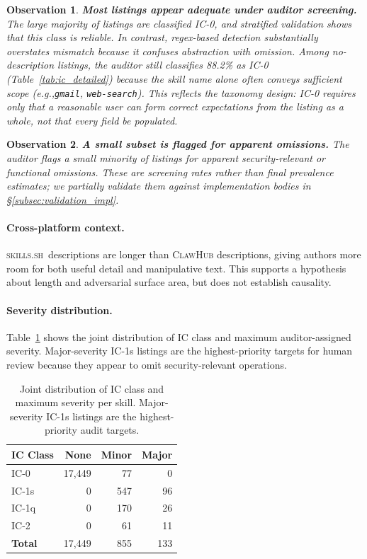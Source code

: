 \documentclass[11pt]{article}
\newtheorem{observation}{Observation}
\newcommand{\clawhub}{\textsc{ClawHub}\xspace}
\newcommand{\skillssh}{\textsc{skills.sh}\xspace}
\newcommand{\eg}{\textit{e.g.,}\xspace}
\begin{document}
\begin{observation}
\textbf{Most listings appear adequate under auditor screening.}
The large majority of listings are classified IC-0, and
stratified validation shows that this class is reliable.
In contrast, regex-based detection substantially overstates
mismatch because it confuses abstraction with omission.
Among no-description listings, the auditor still classifies
88.2\% as IC-0 (Table~\ref{tab:ic_detailed}) because
the skill \emph{name} alone often conveys sufficient scope
(\eg \texttt{gmail}, \texttt{web-search}).
This reflects the taxonomy design: IC-0 requires only that
a reasonable user can form correct expectations from the
listing as a whole, not that every field be populated.
\end{observation}

\begin{observation}
\textbf{A small subset is flagged for apparent omissions.}
The auditor flags a small minority of listings for apparent
security-relevant or functional omissions.
These are screening rates rather than final prevalence
estimates; we partially validate them against implementation
bodies in \S\ref{subsec:validation_impl}.
\end{observation}

\paragraph{Cross-platform context.}
\skillssh\ descriptions are longer than \clawhub{}
descriptions, giving authors more room for both useful
detail and manipulative text.
This supports a hypothesis about length and adversarial
surface area, but does not establish causality.

\paragraph{Severity distribution.}
Table~\ref{tab:severity} shows the joint distribution of
IC class and maximum auditor-assigned severity.
Major-severity IC-1s listings are the highest-priority
targets for human review because they appear to omit
security-relevant operations.

\begin{table}[t]
\centering\small
\begin{tabular}{lrrr}
\toprule
\textbf{IC Class} & \textbf{None} & \textbf{Minor} & \textbf{Major} \\
\midrule
IC-0  & 17,449 & 77 & 0 \\
IC-1s & 0 & 547 & 96 \\
IC-1q & 0 & 170 & 26 \\
IC-2  & 0 & 61  & 11 \\
\midrule
\textbf{Total} & 17,449 & 855 & 133 \\
\bottomrule
\end{tabular}
\caption{Joint distribution of IC class and maximum severity
per skill. Major-severity IC-1s listings are the
highest-priority audit targets.}
\label{tab:severity}
\end{table}
\end{document}
